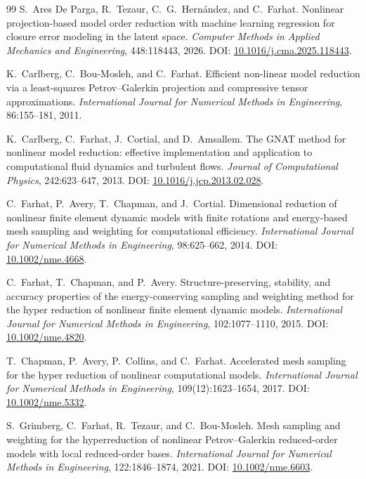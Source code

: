 \documentclass[a4paper,12pt]{article}
\begin{document}
\begin{thebibliography}{99}
S.~Ares De Parga, R.~Tezaur, C.~G.~Hern\'andez, and C.~Farhat.
Nonlinear projection-based model order reduction with machine learning regression for closure error modeling in the latent space.
\textit{Computer Methods in Applied Mechanics and Engineering}, 448:118443, 2026.
DOI: \href{https://doi.org/10.1016/j.cma.2025.118443}{10.1016/j.cma.2025.118443}.

K.~Carlberg, C.~Bou-Mosleh, and C.~Farhat.
Efficient non-linear model reduction via a least-squares Petrov--Galerkin projection and compressive tensor approximations.
\textit{International Journal for Numerical Methods in Engineering}, 86:155--181, 2011.

K.~Carlberg, C.~Farhat, J.~Cortial, and D.~Amsallem.
The GNAT method for nonlinear model reduction: effective implementation and application to computational fluid dynamics and turbulent flows.
\textit{Journal of Computational Physics}, 242:623--647, 2013.
DOI: \href{https://doi.org/10.1016/j.jcp.2013.02.028}{10.1016/j.jcp.2013.02.028}.

C.~Farhat, P.~Avery, T.~Chapman, and J.~Cortial.
Dimensional reduction of nonlinear finite element dynamic models with finite rotations and energy-based mesh sampling and weighting for computational efficiency.
\textit{International Journal for Numerical Methods in Engineering}, 98:625--662, 2014.
DOI: \href{https://doi.org/10.1002/nme.4668}{10.1002/nme.4668}.

C.~Farhat, T.~Chapman, and P.~Avery.
Structure-preserving, stability, and accuracy properties of the energy-conserving sampling and weighting method for the hyper reduction of nonlinear finite element dynamic models.
\textit{International Journal for Numerical Methods in Engineering}, 102:1077--1110, 2015.
DOI: \href{https://doi.org/10.1002/nme.4820}{10.1002/nme.4820}.

T.~Chapman, P.~Avery, P.~Collins, and C.~Farhat.
Accelerated mesh sampling for the hyper reduction of nonlinear computational models.
\textit{International Journal for Numerical Methods in Engineering}, 109(12):1623--1654, 2017.
DOI: \href{https://doi.org/10.1002/nme.5332}{10.1002/nme.5332}.

S.~Grimberg, C.~Farhat, R.~Tezaur, and C.~Bou-Mosleh.
Mesh sampling and weighting for the hyperreduction of nonlinear Petrov--Galerkin reduced-order models with local reduced-order bases.
\textit{International Journal for Numerical Methods in Engineering}, 122:1846--1874, 2021.
DOI: \href{https://doi.org/10.1002/nme.6603}{10.1002/nme.6603}.


\end{thebibliography}
\end{document}
